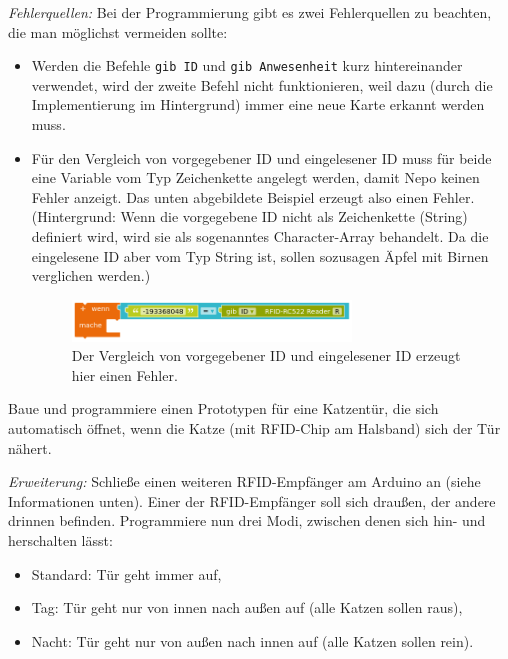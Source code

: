 \emph{Fehlerquellen:} Bei der Programmierung gibt es zwei Fehlerquellen zu beachten, die man möglichst vermeiden sollte:
\begin{itemize}[itemsep=0ex,parsep=0ex]
	\item Werden die Befehle \texttt{gib ID} und \texttt{gib Anwesenheit} kurz hintereinander verwendet, wird der zweite Befehl nicht funktionieren, weil dazu (durch die Implementierung im Hintergrund) immer eine neue Karte erkannt werden muss.
	\item Für den Vergleich von vorgegebener ID und eingelesener ID muss für beide eine Variable vom Typ Zeichenkette angelegt werden, damit Nepo keinen Fehler anzeigt. Das unten abgebildete Beispiel erzeugt also einen Fehler. (Hintergrund: Wenn die vorgegebene ID nicht als Zeichenkette (String) definiert wird, wird sie als sogenanntes Character-Array behandelt. Da die eingelesene ID aber vom Typ String ist, sollen sozusagen Äpfel mit Birnen verglichen werden.)
	\begin{figure}[H]
		\centering
		\includegraphics[width=0.7\textwidth]{./pics/rfid-fehler-vgl-chararray-mit-string.png}
		\caption{Der Vergleich von vorgegebener ID und eingelesener ID erzeugt hier einen Fehler.}
	\end{figure}
\end{itemize}

\begin{projekt}[Katzentür] \label{proj:katzentuer}
	Baue und programmiere einen Prototypen für eine Katzentür, die sich automatisch öffnet, wenn die Katze (mit RFID-Chip am Halsband) sich der Tür nähert.
	
	\emph{Erweiterung:} Schließe einen weiteren RFID-Empfänger am Arduino an (siehe Informationen unten). Einer der RFID-Empfänger soll sich draußen, der andere drinnen befinden. Programmiere nun drei Modi, zwischen denen sich hin- und herschalten lässt:
	\begin{itemize}[itemsep=0ex, parsep=0ex]
		\item Standard: Tür geht immer auf,
		\item Tag: Tür geht nur von innen nach außen auf (alle Katzen sollen raus),
		\item Nacht: Tür geht nur von außen nach innen auf (alle Katzen sollen rein).
	\end{itemize}
\end{projekt}

